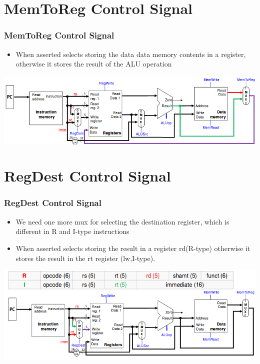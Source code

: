 \documentclass{beamer}
\begin{document}
\section{MemToReg Control Signal}
\begin{frame}
\frametitle{MemToReg Control Signal}
\begin{itemize}
\item When asserted selects storing the data {\color{red}data memory contents} in a register, otherwise it stores the {\color{green}result of the ALU operation}
\end{itemize}
\includegraphics[scale=0.4]{memreg.png}
\end{frame}
\section{RegDest Control Signal}
\begin{frame}
\frametitle{RegDest Control Signal}
\begin{itemize}
\item We need one more mux for selecting the destination register, which is different in R and I-type instructions
\item When asserted selects storing the result in a register {\color{red}rd(R-type)} otherwise it stores the result in the {\color{green}rt} register {\color{green}(lw,I-type)}.
\end{itemize}
\includegraphics[scale=0.4]{regdest.png}
\end{frame}
\end{document}
